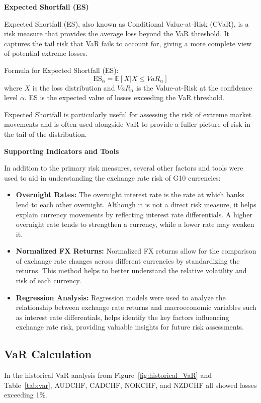 \documentclass{article}
\begin{document}
\textbf{Expected Shortfall (ES)}

Expected Shortfall (ES), also known as Conditional Value-at-Risk (CVaR), is a risk measure that provides the average loss beyond the VaR threshold. It captures the tail risk that VaR fails to account for, giving a more complete view of potential extreme losses.

Formula for Expected Shortfall (ES):
\[
\text{ES}_{\alpha} = \mathbb{E}[X | X \leq VaR_{\alpha}]
\]
where \(X\) is the loss distribution and \(VaR_{\alpha}\) is the Value-at-Risk at the confidence level \(\alpha\). ES is the expected value of losses exceeding the VaR threshold.

Expected Shortfall is particularly useful for assessing the risk of extreme market movements and is often used alongside VaR to provide a fuller picture of risk in the tail of the distribution.

\textbf{Supporting Indicators and Tools}

In addition to the primary risk measures, several other factors and tools were used to aid in understanding the exchange rate risk of G10 currencies:

\begin{itemize}
    \item \textbf{Overnight Rates:} The overnight interest rate is the rate at which banks lend to each other overnight. Although it is not a direct risk measure, it helps explain currency movements by reflecting interest rate differentials. A higher overnight rate tends to strengthen a currency, while a lower rate may weaken it.
    \item \textbf{Normalized FX Returns:} Normalized FX returns allow for the comparison of exchange rate changes across different currencies by standardizing the returns. This method helps to better understand the relative volatility and risk of each currency.
    \item \textbf{Regression Analysis:} Regression models were used to analyze the relationship between exchange rate returns and macroeconomic variables such as interest rate differentials, helps identify the key factors influencing exchange rate risk, providing valuable insights for future risk assessments.
\end{itemize}


\subsection{VaR Calculation}
In the historical VaR analysis from Figure~\ref{fig:historical_VaR} and Table~\ref{tab:var}, AUDCHF, CADCHF, NOKCHF, and NZDCHF all showed losses exceeding 1\%. 
\end{document}
